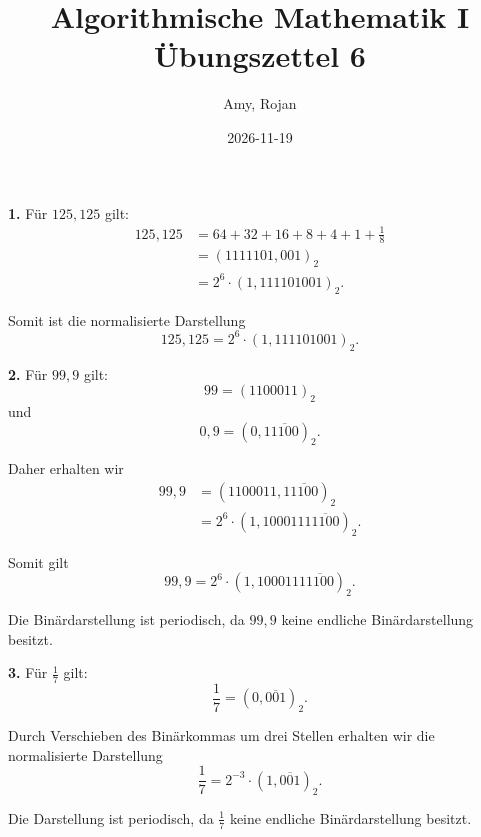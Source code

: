 \documentclass{report}
\title{\huge{Algorithmische Mathematik I \\ Übungszettel 6}}
\author{\huge{Amy, Rojan}}
\date{2026-11-19}
\begin{document}
\maketitle





\sol

\begin{myproof}
  \textbf{1.} Für $125{,}125$ gilt:
  \begin{align*}
    125{,}125
    &=64+32+16+8+4+1+\frac18\\
    &=(1111101{,}001)_2\\
    &=2^6\cdot(1{,}111101001)_2.
  \end{align*}

  Somit ist die normalisierte Darstellung
  \[
    \boxed{
      125{,}125=2^6\cdot(1{,}111101001)_2.
    }
  \]

  \medskip
  \textbf{2.} Für $99{,}9$ gilt:
  \[
    99=(1100011)_2
  \]
  und
  \[
    0{,}9=(0{,}1\overline{1100})_2.
  \]

  Daher erhalten wir
  \begin{align*}
    99{,}9
    &=(1100011{,}1\overline{1100})_2\\
    &=2^6\cdot
      (1{,}1000111\overline{1100})_2.
  \end{align*}

  Somit gilt
  \[
    \boxed{
      99{,}9
      =2^6\cdot
      (1{,}1000111\overline{1100})_2.
    }
  \]

  Die Binärdarstellung ist periodisch,
  da $99{,}9$ keine endliche
  Binärdarstellung besitzt.

  \medskip
  \textbf{3.} Für $\frac17$ gilt:
  \[
    \frac17=(0,\overline{001})_2.
  \]

  Durch Verschieben des Binärkommas um drei Stellen
  erhalten wir die normalisierte Darstellung
  \[
    \boxed{
      \frac17=2^{-3}\cdot(1,\overline{001})_2.
    }
  \]

  Die Darstellung ist periodisch, da $\frac17$
  keine endliche Binärdarstellung besitzt.
\end{myproof}


\newpage


\end{document}
